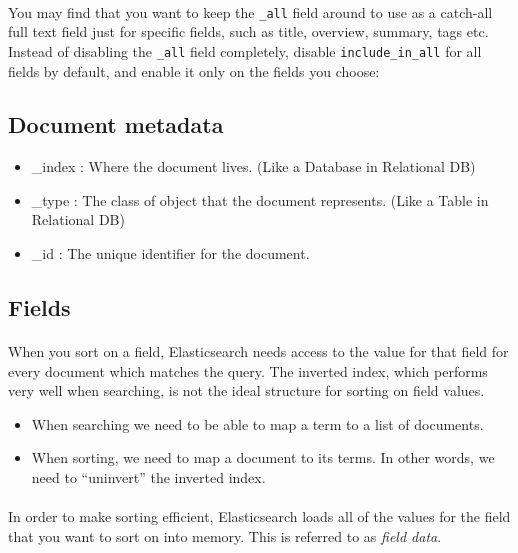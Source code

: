 \documentclass{article}%
\begin{document}
\paragraph{} You may find that you want to keep the \texttt{\_all} field around to use as a catch-all full text field just for specific fields, such as title, overview, summary, tags etc. Instead of disabling the \texttt{\_all} field completely, disable \texttt{include\_in\_all} for all fields by default, and enable it only on the fields you choose:

\subsection{Document metadata}

\begin{itemize}
	\item \_index : Where the document lives. (Like a Database in Relational DB)
	\item \_type : The class of object that the document represents. (Like a Table in Relational DB)
	\item \_id : The unique identifier for the document.
\end{itemize}

\subsection{Fields}
\label{Fields}

\paragraph{} When you sort on a field, Elasticsearch needs access to the value for that field for every document which matches the query. The inverted index, which performs very well when searching, is not the ideal structure for sorting on field values.

\begin{itemize}
	\item When searching we need to be able to map a term to a list of documents.
	\item When sorting, we need to map a document to its terms. In other words, we need to “uninvert” the inverted index. 
\end{itemize}

\paragraph{} In order to make sorting efficient, Elasticsearch loads all of the values for the field that you want to sort on into memory. This is referred to as \textit{field data}.
\end{document}
